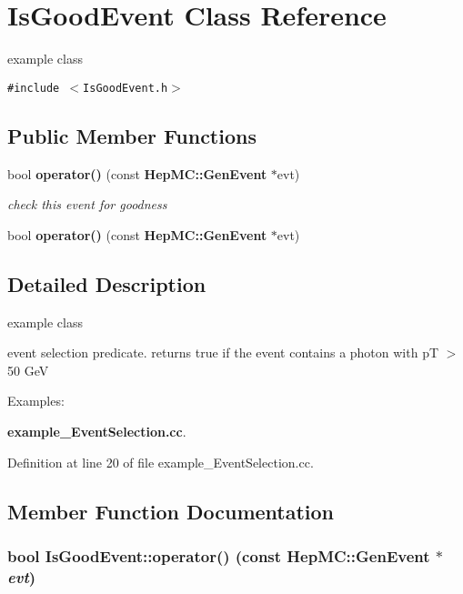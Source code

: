 \section{Is\-Good\-Event Class Reference}
\label{classIsGoodEvent}
example class  


{\tt \#include $<$Is\-Good\-Event.h$>$}

\subsection*{Public Member Functions}
\begin{CompactItemize}
\item 
bool {\bf operator()} (const {\bf Hep\-MC::Gen\-Event} $\ast$evt)
\begin{CompactList}\small\item\em check this event for goodness \item\end{CompactList}\item 
bool {\bf operator()} (const {\bf Hep\-MC::Gen\-Event} $\ast$evt)
\end{CompactItemize}


\subsection{Detailed Description}
example class 

event selection predicate. returns true if the event contains a photon with p\-T $>$ 50 Ge\-V \begin{Desc}
\item[Examples: ]\par


{\bf example\_\-Event\-Selection.cc}.\end{Desc}




Definition at line 20 of file example\_\-Event\-Selection.cc.

\subsection{Member Function Documentation}
\subsubsection{\setlength{\rightskip}{0pt plus 5cm}bool Is\-Good\-Event::operator() (const {\bf Hep\-MC::Gen\-Event} $\ast$ {\em evt})\hspace{0.3cm}{\tt  [inline]}}\label{classIsGoodEvent_eb8864821e4db5babf9b002764a8b295}


